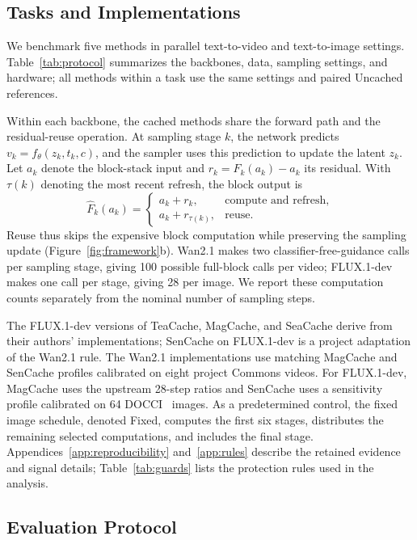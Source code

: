 \documentclass[10pt,twocolumn,letterpaper]{article}
\begin{document}
\subsection{Tasks and Implementations}
We benchmark five methods in parallel text-to-video and text-to-image settings.
Table~\ref{tab:protocol} summarizes the backbones, data, sampling settings, and hardware; all methods within a task use the same settings and paired Uncached references.

Within each backbone, the cached methods share the forward path and the residual-reuse operation.
At sampling stage $k$, the network predicts $v_k=f_\theta(z_k,t_k,c)$, and the sampler uses this prediction to update the latent $z_k$.
Let $a_k$ denote the block-stack input and $r_k=F_k(a_k)-a_k$ its residual.
With $\tau(k)$ denoting the most recent refresh, the block output is
\begin{equation}
 \widehat F_k(a_k)=
 \begin{cases}
 a_k+r_k,&\text{compute and refresh},\\
 a_k+r_{\tau(k)},&\text{reuse}.
 \end{cases}
\end{equation}
Reuse thus skips the expensive block computation while preserving the sampling update (Figure~\ref{fig:framework}b).
Wan2.1 makes two classifier-free-guidance calls per sampling stage, giving 100 possible full-block calls per video; \mbox{FLUX.1-dev} makes one call per stage, giving 28 per image.
We report these computation counts separately from the nominal number of sampling steps.

The \mbox{FLUX.1-dev} versions of TeaCache, MagCache, and SeaCache derive from their authors' implementations; SenCache on \mbox{FLUX.1-dev} is a project adaptation of the Wan2.1 rule.
The Wan2.1 implementations use matching MagCache and SenCache profiles calibrated on eight project Commons videos.
For \mbox{FLUX.1-dev}, MagCache uses the upstream 28-step ratios and SenCache uses a sensitivity profile calibrated on 64 DOCCI~\cite{onoe2024docci} images.
As a predetermined control, the fixed image schedule, denoted Fixed, computes the first six stages, distributes the remaining selected computations, and includes the final stage.
Appendices~\ref{app:reproducibility} and~\ref{app:rules} describe the retained evidence and signal details; Table~\ref{tab:guards} lists the protection rules used in the analysis.

\subsection{Evaluation Protocol}
\end{document}
